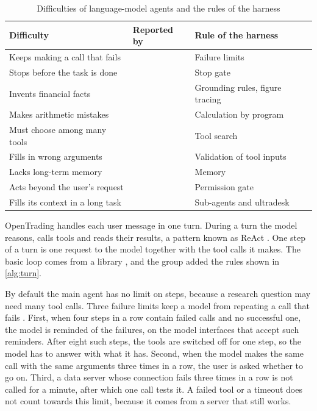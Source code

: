 \begin{table}[H]
  \centering
  \caption{Difficulties of language-model agents and the rules of the harness}\label{tab:problems}
  \begin{tabularx}{\textwidth}{@{}L L l@{}}
    \toprule
    {Difficulty} & {Reported by} & {Rule of the harness}\\
    \midrule
    Keeps making a call that fails & \textcite{qin2024toolllm} & Failure limits\\
    Stops before the task is done & \textcite{anthropic2025harnesses} & Stop gate\\
    Invents financial facts & \textcite{kang2023deficiency} & Grounding rules, figure tracing\\
    Makes arithmetic mistakes & \textcite{gao2023pal} & Calculation by program\\
    Must choose among many tools & \textcite{qin2024toolllm} & Tool search\\
    Fills in wrong arguments & \textcite{yao2024taubench} & Validation of tool inputs\\
    Lacks long-term memory & \textcite{packer2023memgpt} & Memory\\
    Acts beyond the user's request & \textcite{anthropic2026auto} & Permission gate\\
    Fills its context in a long task & \textcite{anthropic2025multiagent} & Sub-agents and ultradesk\\
    \bottomrule
  \end{tabularx}
\end{table}

\label{sec:agent-loop}
OpenTrading handles each user message in one turn.
During a turn the model reasons, calls tools and reads their results, a pattern known as ReAct \parencite{yao2023react}.
One step of a turn is one request to the model together with the tool calls it makes.
The basic loop comes from a library \parencite{vercelndloop}, and the group added the rules shown in \cref{alg:turn}.

By default the main agent has no limit on steps, because a research question may need many tool calls.
Three failure limits keep a model from repeating a call that fails \parencite{qin2024toolllm}.
First, when four steps in a row contain failed calls and no successful one, the model is reminded of the failures, on the model interfaces that accept such reminders.
After eight such steps, the tools are switched off for one step, so the model has to answer with what it has.
Second, when the model makes the same call with the same arguments three times in a row, the user is asked whether to go on.
Third, a data server whose connection fails three times in a row is not called for a minute, after which one call tests it.
A failed tool or a timeout does not count towards this limit, because it comes from a server that still works.


